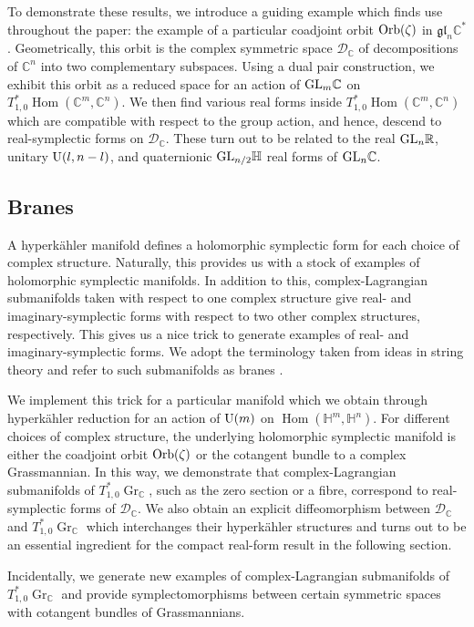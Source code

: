 \documentclass[pdftex]{sigma}
\numberwithin{equation}{section}
\DeclareMathOperator{\Hom}{Hom}
\DeclareMathOperator{\Gr}{Gr}
\newcommand{\R}{\mathbb{R}}
\newcommand{\C}{\mathbb{C}}
\newcommand{\D}{\mathcal{D}}
\newcommand{\Q}{\mathbb{H}}
\begin{document}
To demonstrate these results, we introduce a guiding example which finds use throughout the paper: the example of a particular coadjoint orbit ${\rm Orb}(\zeta)$ in $\mathfrak{gl}_n\C^*$. Geometrically, this orbit is the complex symmetric space $\D_\C$ of decompositions of $\C^n$ into two complementary subspaces. Using a dual pair construction, we exhibit this orbit as a reduced space for an action of ${\rm GL}_m\C$ on $T^*_{1,0}\Hom(\C^m,\C^n)$. We then find various real forms inside $T^*_{1,0}\Hom(\C^m,\C^n)$ which are compatible with respect to the group action, and hence, descend to real-symplectic forms on $\D_{\C}$. These turn out to be related to the real ${\rm GL}_n\R$, unitary ${\rm U}(l,n-l)$, and quaternionic ${\rm GL}_{n/2}\Q$ real forms of ${\rm GL}_n\C$.

\subsection{Branes}
A hyperk\"{a}hler manifold defines a holomorphic symplectic form for each choice of complex structure. Naturally, this provides us with a stock of examples of holomorphic symplectic manifolds. In addition to this, complex-Lagrangian submanifolds taken with respect to one complex structure give real- and imaginary-symplectic forms with respect to two other complex structures, respectively. This gives us a nice trick to generate examples of real- and imaginary-symplectic forms. We adopt the terminology taken from ideas in string theory and refer to such submanifolds as branes \cite{witten2, witten1}.

We implement this trick for a particular manifold which we obtain through hyperk\"{a}hler reduction for an action of ${\rm U}(m)$ on $\Hom(\Q^m,\Q^n)$. For different choices of complex structure, the underlying holomorphic symplectic manifold is either the coadjoint orbit ${\rm Orb}(\zeta)$ or the cotangent bundle to a complex Grassmannian. In this way, we demonstrate that complex-Lagrangian submanifolds of $T^*_{1,0}\Gr_\C$, such as the zero section or a fibre, correspond to real-symplectic forms of $\D_\C$. We also obtain an explicit diffeomorphism between $\D_{\C}$ and $T^*_{1,0}\Gr_\C$ which interchanges their hyperk\"{a}hler structures and turns out to be an essential ingredient for the compact real-form result in the following section.

Incidentally, we generate new examples of complex-Lagrangian submanifolds of $T^*_{1,0}\Gr_\C$ and provide symplectomorphisms between certain symmetric spaces with cotangent bundles of Grassmannians.
\end{document}
